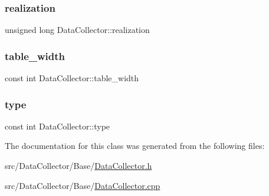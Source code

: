 \mbox{\label{classDataCollector_a9ef2887466fe3123aa19ef956a219b96_a9ef2887466fe3123aa19ef956a219b96}} 
\subsubsection{\texorpdfstring{realization}{realization}}
{\footnotesize\ttfamily unsigned long Data\+Collector\+::realization}

\mbox{\label{classDataCollector_af46c27a47de92d92dcdae6b26a905a44_af46c27a47de92d92dcdae6b26a905a44}} 
\subsubsection{\texorpdfstring{table\+\_\+width}{table\_width}}
{\footnotesize\ttfamily const int Data\+Collector\+::table\+\_\+width}

\mbox{\label{classDataCollector_acad1c22d67a8eb3db056ba776a131900_acad1c22d67a8eb3db056ba776a131900}} 
\subsubsection{\texorpdfstring{type}{type}}
{\footnotesize\ttfamily const int Data\+Collector\+::type}



The documentation for this class was generated from the following files\+:\begin{DoxyCompactItemize}
\item 
src/\+Data\+Collector/\+Base/\mbox{\hyperlink{DataCollector_8h}{Data\+Collector.\+h}}\item 
src/\+Data\+Collector/\+Base/\mbox{\hyperlink{DataCollector_8cpp}{Data\+Collector.\+cpp}}\end{DoxyCompactItemize}
